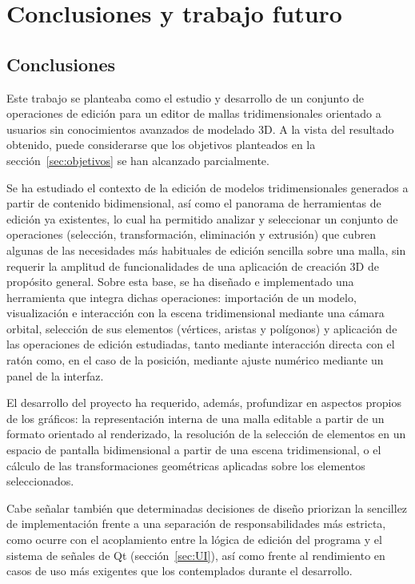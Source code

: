 \chapter{Conclusiones y trabajo futuro}
\label{cap:conclusiones}

\section{Conclusiones}

Este trabajo se planteaba como el estudio y desarrollo de un conjunto de operaciones de edición para un editor de mallas tridimensionales orientado a usuarios sin conocimientos avanzados de modelado 3D. A la vista del resultado obtenido, puede considerarse que los objetivos planteados en la sección~\ref{sec:objetivos} se han alcanzado parcialmente.

Se ha estudiado el contexto de la edición de modelos tridimensionales generados a partir de contenido bidimensional, así como el panorama de herramientas de edición ya existentes, lo cual ha permitido analizar y seleccionar un conjunto de operaciones (selección, transformación, eliminación y extrusión) que cubren algunas de las necesidades más habituales de edición sencilla sobre una malla, sin requerir la amplitud de funcionalidades de una aplicación de creación 3D de propósito general. Sobre esta base, se ha diseñado e implementado una herramienta que integra dichas operaciones: importación de un modelo, visualización e interacción con la escena tridimensional mediante una cámara orbital, selección de sus elementos (vértices, aristas y polígonos) y aplicación de las operaciones de edición estudiadas, tanto mediante interacción directa con el ratón como, en el caso de la posición, mediante ajuste numérico mediante un panel de la interfaz.

El desarrollo del proyecto ha requerido, además, profundizar en aspectos propios de los gráficos: la representación interna de una malla editable a partir de un formato orientado al renderizado, la resolución de la selección de elementos en un espacio de pantalla bidimensional a partir de una escena tridimensional, o el cálculo de las transformaciones geométricas aplicadas sobre los elementos seleccionados.

Cabe señalar también que determinadas decisiones de diseño priorizan la sencillez de implementación frente a una separación de responsabilidades más estricta, como ocurre con el acoplamiento entre la lógica de edición del programa y el sistema de señales de Qt (sección~\ref{sec:UI}), así como frente al rendimiento en casos de uso más exigentes que los contemplados durante el desarrollo.


